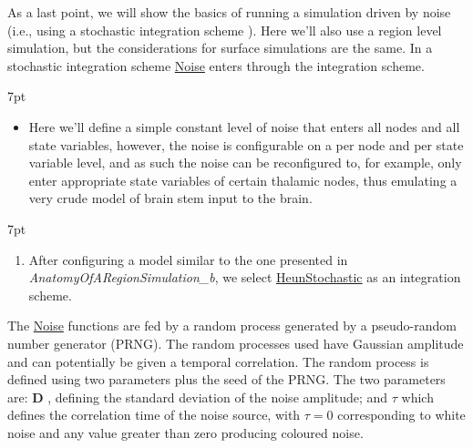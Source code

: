 \documentclass{tufte-handout}
\newenvironment{simulation}{%
  \def\FrameCommand{%
    \hspace{1pt}%
    {\color{ForestGreen}\vrule width 2pt}%
    {\color{simulationshade}\vrule width 4pt}%
    \colorbox{simulationshade}%
  }%
  \MakeFramed{\advance\hsize-\width\FrameRestore}%
  \noindent\hspace{-4.55pt}%
  \begin{adjustwidth}{}{7pt}%
  \vspace{2pt}\vspace{2pt}%
}
{%
  \vspace{2pt}\end{adjustwidth}\endMakeFramed%
}
\newenvironment{blah}{%
  \def\FrameCommand{%
    \hspace{1pt}%
    {\color{DarkOrange}\vrule width 2pt}%
    {\color{PeachPuff}\vrule width 4pt}%
    \colorbox{PeachPuff}%
  }%
  \MakeFramed{\advance\hsize-\width\FrameRestore}%
  \noindent\hspace{-4.55pt}%
  \begin{adjustwidth}{}{7pt}%
  \vspace{2pt}\vspace{2pt}%
}
{%
  \vspace{2pt}\end{adjustwidth}\endMakeFramed%
}
\begin{document}
As a last point, we will show the basics of running a simulation driven by
noise (i.e., using a stochastic integration scheme ). Here we'll also use a region
level simulation, but the considerations for surface simulations are the same.
In a stochastic integration scheme \underline{Noise} enters through the integration
scheme. 

\begin{blah}
\begin{itemize}
\item Here we'll define a simple constant level of noise that enters all
nodes and all state variables, however, the noise is configurable on a per
node and per state variable level, and as such the noise can be reconfigured
to, for example, only enter appropriate state variables of certain thalamic
nodes, thus emulating a very crude model of brain stem input to the brain. 
\end{itemize}
\end{blah}

\begin{simulation}
\begin{enumerate}
\item After configuring a model similar to the one presented in  \textit{AnatomyOfARegionSimulation\_b}, we select \underline{HeunStochastic} as an integration scheme.  
\end{enumerate}
\end{simulation}

The \underline{Noise} functions are fed by a
random process generated by a pseudo-random number generator (PRNG). The random
processes used have Gaussian amplitude and can potentially be given a temporal
correlation. The random process is defined using two
parameters plus the seed of the PRNG. The two parameters are: $\mathbf{D}$ , defining the
standard deviation of the noise amplitude; and ${\tau}$ which defines the
correlation time of the noise source, with $\tau = 0$ corresponding to white
noise and any value greater than zero producing coloured noise. 
\end{document}
